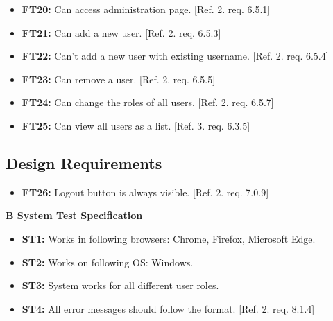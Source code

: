 \documentclass{article}
\begin{document}
			\begin{itemize}
			
			\item \textbf{FT20:} Can access administration page. [Ref. 2. req. 6.5.1]			
			
  			\item \textbf{FT21:} Can add a new user. [Ref. 2. req. 6.5.3]
  			
  			\item \textbf{FT22:} Can't add a new user with existing username. [Ref. 2. req. 6.5.4]

  			\item \textbf{FT23:} Can remove a user. [Ref. 2. req. 6.5.5]
  			
  			\item \textbf{FT24:} Can change the roles of all users. [Ref. 2. req. 6.5.7]
  			
  			\item \textbf{FT25:} Can view all users as a list. [Ref. 3. req. 6.3.5]

		\end{itemize}
		
		\subsection{Design Requirements}
		
		\begin{itemize}
  			
  			\item \textbf{FT26:} Logout button is always visible. [Ref. 2. req. 7.0.9]

		\end{itemize}
		
		\newpage
		\begin{flushleft}
		{\large \textbf{B System Test Specification}}
		\end{flushleft}
		
		
		
		\begin{itemize}
		
  			\item \textbf{ST1:} Works in following browsers: Chrome, Firefox, Microsoft Edge.  
  			
  			\item \textbf{ST2:} Works on following OS: Windows.	 			
  			
  			\item \textbf{ST3:} System works for all different user roles. 
  			
  			\item \textbf{ST4:} All error messages should follow the format. [Ref. 2. req. 8.1.4]

  			
		\end{itemize}
		
\end{document}

